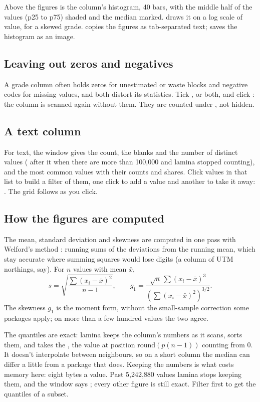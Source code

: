 Above the figures is the column's histogram, 40 bars, with the middle half of the values (p25 to p75)
shaded and the median marked.  draws it on a log scale of value, for a skewed grade.
 copies the figures as tab-separated text;  saves the histogram as an image.

\subsection{Leaving out zeros and negatives}

A grade column often holds zeros for unestimated or waste blocks and negative codes for missing values,
and both distort its statistics. Tick ,  or both, and click
: the column is scanned again without them. They are counted under , not hidden.

\subsection{A text column}

For text, the window gives the count, the blanks and the number of distinct values (\ui{+} after it when
there are more than 100{,}000 and lamina stopped counting), and the most common values with their counts
and shares. Click values in that list to build a filter of them, one click to add a value and another to
take it away: . The grid follows as you click.

\subsection{How the figures are computed}\label{sec:stats-maths}

The mean, standard deviation and skewness are computed in one pass with Welford's method
\parencite{welford1962}: running sums of the deviations from the running mean, which stay accurate where
summing squares would lose digits (a column of UTM northings, say). For $n$ values with mean
$\bar{x}$,
\[
s = \sqrt{\frac{\sum (x_i-\bar{x})^2}{n-1}}, \qquad
g_1 = \frac{\sqrt{n}\,\sum (x_i-\bar{x})^3}{\left(\sum (x_i-\bar{x})^2\right)^{3/2}} .
\]
The skewness $g_1$ is the moment form, without the small-sample correction some packages apply; on more
than a few hundred values the two agree.

The quantiles are exact: lamina keeps the column's numbers as it scans, sorts them, and takes the
, the value at position $\mathrm{round}(p(n-1))$ counting from 0. It doesn't
interpolate between neighbours, so on a short column the median can differ a little from a package that
does. Keeping the numbers is what costs memory here: eight bytes a value. Past 5{,}242{,}880 values lamina
stops keeping them, and the window says ; every other figure is still
exact. Filter first to get the quantiles of a subset.

